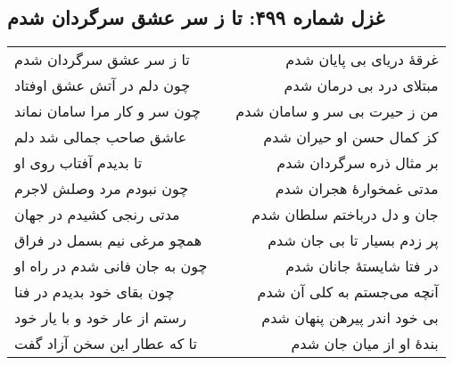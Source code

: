 \begin{center}
\section*{غزل شماره ۴۹۹: تا ز سر عشق سرگردان شدم}
\label{sec:499}
\begin{longtable}{l p{0.5cm} r}
تا ز سر عشق سرگردان شدم
&&
غرقهٔ دریای بی پایان شدم
\\
چون دلم در آتش عشق اوفتاد
&&
مبتلای درد بی درمان شدم
\\
چون سر و کار مرا سامان نماند
&&
من ز حیرت بی سر و سامان شدم
\\
عاشق صاحب جمالی شد دلم
&&
کز کمال حسن او حیران شدم
\\
تا بدیدم آفتاب روی او
&&
بر مثال ذره سرگردان شدم
\\
چون نبودم مرد وصلش لاجرم
&&
مدتی غمخوارهٔ هجران شدم
\\
مدتی رنجی کشیدم در جهان
&&
جان و دل درباختم سلطان شدم
\\
همچو مرغی نیم بسمل در فراق
&&
پر زدم بسیار تا بی جان شدم
\\
چون به جان فانی شدم در راه او
&&
در فتا شایستهٔ جانان شدم
\\
چون بقای خود بدیدم در فنا
&&
آنچه می‌جستم به کلی آن شدم
\\
رستم از عار خود و با یار خود
&&
بی خود اندر پیرهن پنهان شدم
\\
تا که عطار این سخن آزاد گفت
&&
بندهٔ او از میان جان شدم
\\
\end{longtable}
\end{center}

